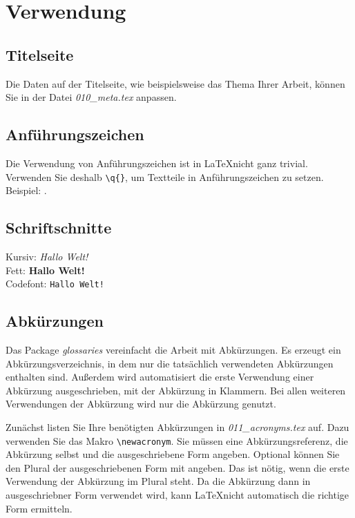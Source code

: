 \section{Verwendung}

\subsection{Titelseite}

Die Daten auf der Titelseite, wie beispielsweise das Thema Ihrer Arbeit, können Sie in der Datei \textit{010\_meta.tex} anpassen. 

\subsection{Anführungszeichen}

Die Verwendung von Anführungszeichen ist in \LaTeX nicht ganz trivial. Verwenden Sie deshalb \lstinline|\q{}|, um Textteile in Anführungszeichen zu setzen. Beispiel: .

\subsection{Schriftschnitte}

Kursiv: \textit{Hallo Welt!} \\
Fett: \textbf{Hallo Welt!} \\
Codefont: \lstinline|Hallo Welt!| \\

\subsection{Abkürzungen}

Das Package \textit{glossaries} vereinfacht die Arbeit mit Abkürzungen. Es erzeugt ein Abkürzungsverzeichnis, in dem nur die tatsächlich verwendeten Abkürzungen enthalten sind. Außerdem wird automatisiert die erste Verwendung einer Abkürzung ausgeschrieben, mit der Abkürzung in Klammern. Bei allen weiteren Verwendungen der Abkürzung wird nur die Abkürzung genutzt.

Zunächst listen Sie Ihre benötigten Abkürzungen in \textit{011\_acronyms.tex} auf. Dazu verwenden Sie das Makro \lstinline|\newacronym|. Sie müssen eine Abkürzungsreferenz, die Abkürzung selbst und die ausgeschriebene Form angeben. Optional können Sie den Plural der ausgeschriebenen Form mit angeben. Das ist nötig, wenn die erste Verwendung der Abkürzung im Plural steht. Da die Abkürzung dann in ausgeschriebner Form verwendet wird, kann \LaTeX nicht automatisch die richtige Form ermitteln. 

